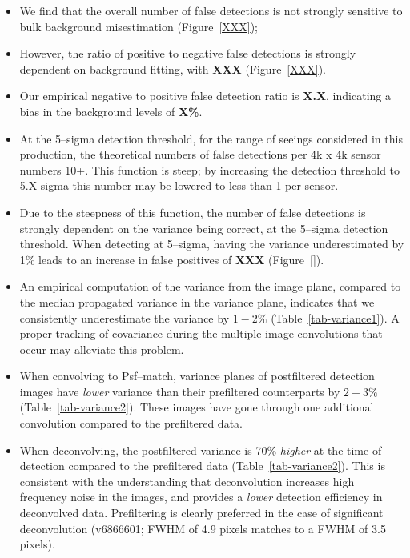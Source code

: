 \documentclass[prd, nofootinbib, floatfix, 11pt,tightenlines,times]{article}
\begin{document}
\begin{itemize}

\item We find that the overall number of false detections is not
  strongly sensitive to bulk background misestimation
  (Figure~\ref{XXX});

\item However, the ratio of positive to negative false detections is
  strongly dependent on background fitting, with {\bf XXX}
  (Figure~\ref{XXX}).

\item Our empirical negative to positive false detection ratio is {\bf
  X.X}, indicating a bias in the background levels of {\bf X\%}.

\item At the 5--sigma detection threshold, for the range of seeings
  considered in this production, the theoretical numbers of false
  detections per 4k x 4k sensor numbers 10+.  This function is steep;
  by increasing the detection threshold to 5.X sigma this number may
  be lowered to less than 1 per sensor.

\item Due to the steepness of this function, the number of false
  detections is strongly dependent on the variance being correct, at
  the 5--sigma detection threshold.  When detecting at 5--sigma,
  having the variance underestimated by 1\% leads to an increase
  in false positives of {\bf XXX} (Figure~\ref{}).

\item An empirical computation of the variance from the image plane,
  compared to the median propagated variance in the variance plane,
  indicates that we consistently underestimate the variance by $1-2\%$
  (Table~\ref{tab-variance1}).  A proper tracking of covariance during
  the multiple image convolutions that occur may alleviate this
  problem.

\item When convolving to Psf--match, variance planes of postfiltered
  detection images have {\it lower} variance than their prefiltered
  counterparts by $2-3\%$ (Table~\ref{tab-variance2}).  These images
  have gone through one additional convolution compared to the
  prefiltered data.

\item When deconvolving, the postfiltered variance is 70\% {\it
  higher} at the time of detection compared to the prefiltered data
  (Table~\ref{tab-variance2}).  This is consistent with the
  understanding that deconvolution increases high frequency noise in
  the images, and provides a {\it lower} detection efficiency in
  deconvolved data.  Prefiltering is clearly preferred in the case of
  significant deconvolution (v6866601; FWHM of 4.9 pixels matches to a
  FWHM of 3.5 pixels).


\end{itemize}
\end{document}
